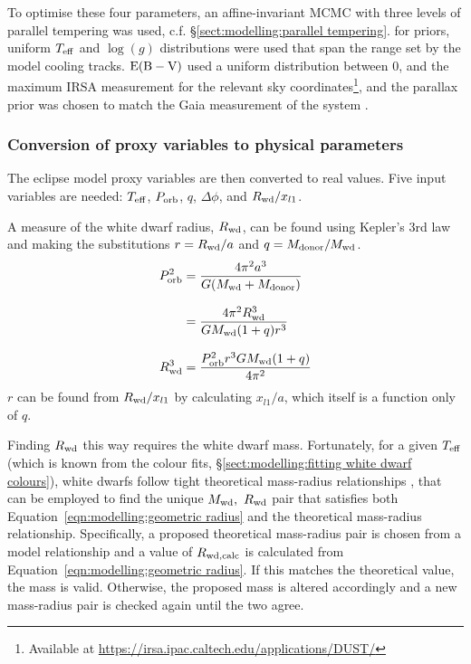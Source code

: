 To optimise these four parameters, an affine-invariant MCMC with three levels of parallel tempering was used, c.f. \S\ref{sect:modelling:parallel tempering}. for priors, uniform $T_{\rm eff}$ and $\log (g)$ distributions were used that span the range set by the model cooling tracks. ${\rm E(B-V)}$ used a uniform distribution between 0, and the maximum IRSA measurement for the relevant sky coordinates\footnote{Available at \href{https://irsa.ipac.caltech.edu/applications/DUST/}{https://irsa.ipac.caltech.edu/applications/DUST/}}, and the parallax prior was chosen to match the Gaia measurement of the system \citep{lindegren2018, Luri2018, Gaia2016, Gaia2018}.

\subsubsection{Conversion of proxy variables to physical parameters}
\label{sect:modelling:conversion to physical parameters}
The eclipse model proxy variables are then converted to real values.
Five input variables are needed: $T_{\rm eff}$, $P_{\rm orb}$, $q$, $\Delta \phi$, and $R_{\rm wd} / x_{l1}$.


A measure of the white dwarf radius, $R_{\rm wd}$, can be found using Kepler's 3rd law and making the substitutions $r = R_{\rm wd} / a$ and $q = M_{\rm donor} / M_{\rm wd}$.
\begin{align}
    P_{\rm orb}^2 &= \frac{4 \pi^2 a^3}{G (M_{\rm wd} + M_{\rm donor})} \\[8pt]
    &= \frac{4 \pi^2 R_{\rm wd}^3}{G M_{\rm wd} (1 + q) r^3} \\[8pt]
    R_{\rm wd}^3 &= \frac{P_{\rm orb}^2 r^3 G M_{\rm wd} (1 + q) }{4 \pi^2}
    \label{eqn:modelling:geometric radius}
\end{align}
$r$ can be found from $R_{\rm wd} / x_{l1}$ by calculating $x_{l1} / a$, which itself is a function only of $q$.

Finding $R_{\rm wd}$ this way requires the white dwarf mass. Fortunately, for a given $T_{\rm eff}$ (which is known from the colour fits, \S\ref{sect:modelling:fitting white dwarf colours}), white dwarfs follow tight theoretical mass-radius relationships \citep{parsons2017}, that can be employed to find the unique $M_{\rm wd},\ R_{\rm wd}$ pair that satisfies both Equation~\ref{eqn:modelling:geometric radius} and the theoretical mass-radius relationship.
Specifically, a proposed theoretical mass-radius pair is chosen from a model relationship and a value of $R_{\rm wd, calc}$ is calculated from Equation~\ref{eqn:modelling:geometric radius}. If this matches the theoretical value, the mass is valid. Otherwise, the proposed mass is altered accordingly and a new mass-radius pair is checked again until the two agree.

